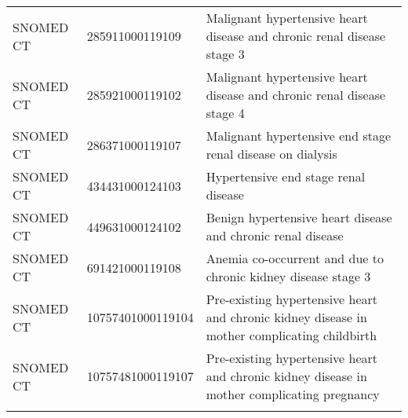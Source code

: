 \begin{longtable}{p{}p{}p{}}
  SNOMED CT & 285911000119109 & Malignant hypertensive heart disease and chronic renal disease stage 3 \\ 
  SNOMED CT & 285921000119102 & Malignant hypertensive heart disease and chronic renal disease stage 4 \\ 
  SNOMED CT & 286371000119107 & Malignant hypertensive end stage renal disease on dialysis \\ 
  SNOMED CT & 434431000124103 & Hypertensive end stage renal disease \\ 
  SNOMED CT & 449631000124102 & Benign hypertensive heart disease and chronic renal disease \\ 
  SNOMED CT & 691421000119108 & Anemia co-occurrent and due to chronic kidney disease stage 3 \\ 
  SNOMED CT & 10757401000119104 & Pre-existing hypertensive heart and chronic kidney disease in mother complicating childbirth \\ 
  SNOMED CT & 10757481000119107 & Pre-existing hypertensive heart and chronic kidney disease in mother complicating pregnancy \\ 
  \hline
\label{tab:codes_chronic-kidney-disease}
\end{longtable}

